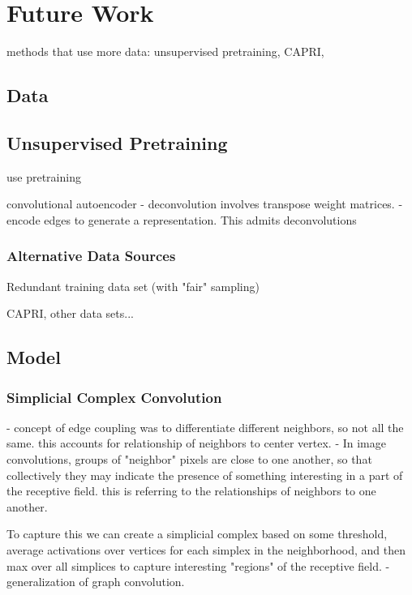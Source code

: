 \chapter{Future Work}
\label{chap:future}

methods that use more data: unsupervised pretraining, CAPRI, 

\section{Data}

\section{Unsupervised Pretraining}

use pretraining

convolutional autoencoder
- deconvolution involves transpose weight matrices. 
	- encode edges to generate a representation. This admits deconvolutions

\subsection{Alternative Data Sources}

Redundant training data set (with "fair" sampling)

CAPRI, other data sets...


\section{Model}

\subsection{Simplicial Complex Convolution}

- concept of edge coupling was to differentiate different neighbors, so not all the same. 
	this accounts for relationship of neighbors to center vertex. 
- In image convolutions, groups of "neighbor" pixels are close to one another, so that collectively they may indicate the presence of something interesting in a part of the receptive field. 
	this is referring to the relationships of neighbors to one another. 

	To capture this we can create a simplicial complex based on some threshold, average activations over vertices for each simplex in the neighborhood, and then max over all simplices to capture interesting "regions" of the receptive field. 
		- generalization of graph convolution.


